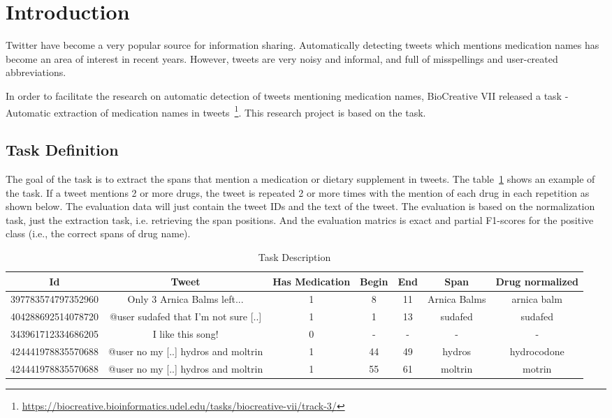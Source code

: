 \section{Introduction}

Twitter have become a very popular source for information sharing. Automatically detecting tweets which mentions medication names has become an area of interest in recent years. However, tweets are very noisy and informal, and full of misspellings and user-created abbreviations. 

In order to facilitate the research on automatic detection of tweets mentioning medication names, BioCreative VII released a task - Automatic extraction of medication names in tweets~\footnote{\url{https://biocreative.bioinformatics.udel.edu/tasks/biocreative-vii/track-3/}}. This research project is based on the task.

\subsection{Task Definition}
The goal of the task is to extract the spans that mention a medication or dietary supplement in tweets. The table~\ref{table:1} shows an example of the task. If a tweet mentions 2 or more drugs, the tweet is repeated 2 or more times with the mention of each drug in each repetition as shown below. The evaluation data will just contain the tweet IDs and the text of the tweet. The evaluation is based on the normalization task, just the extraction task, i.e. retrieving the span positions. And the evaluation matrics is exact and partial F1-scores for the positive class (i.e., the correct spans of drug name).


\begin{table}[h!]
	\centering
	\begin{tabular}{||c c c c c c c||} 
		\hline
		Id & Tweet & Has Medication & Begin & End & Span & Drug normalized \\ [0.5ex] 
		\hline\hline
		397783574797352960 & Only 3 Arnica Balms left... & 1 & 8 & 11 & Arnica Balms & arnica balm \\ 
		404288692514078720 & @user sudafed that I'm not sure [..] & 1 & 1 & 13 & sudafed & sudafed \\
		343961712334686205 & I like this song! & 0 & - & - & - & - \\
		424441978835570688 & @user no my [..] hydros and moltrin & 1 & 44 & 49 & hydros & hydrocodone \\
		424441978835570688 & @user no my [..] hydros and moltrin & 1 &  55 & 61 & moltrin & motrin \\ [1ex] 
		\hline
	\end{tabular}
	\caption{Task Description}
	\label{table:1}
\end{table}

